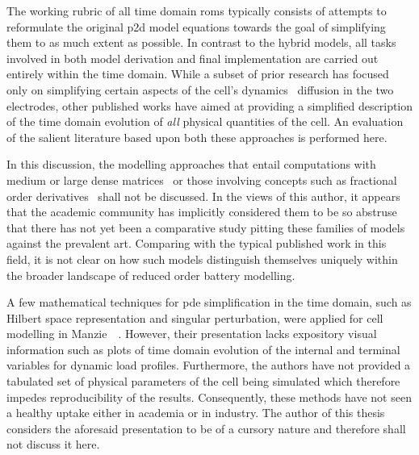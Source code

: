 The working rubric of all time domain \glspl{rom} typically consists of attempts
to  reformulate the  original  \gls{p2d}  model equations  towards  the goal  of
simplifying  them to  as much  extent  as possible.  In contrast  to the  hybrid
models, all tasks involved in both model derivation and final implementation are
carried out  entirely within the time  domain. While a subset  of prior research
has  focused  only  on  simplifying  certain  aspects  of  the  cell's  dynamics
\eg~diffusion  in  the two  electrodes,  other  published  works have  aimed  at
providing a  simplified description of  the time domain evolution  of \emph{all}
physical quantities of  the cell. An evaluation of the  salient literature based
upon both these approaches is performed here.


In  this discussion,  the  modelling approaches  that  entail computations  with
medium or large dense matrices~\cite{Li2016,Xu2016,Corno2015} or those involving
concepts such  as fractional  order derivatives~\cite{Sabatier2014,Sabatier2015,
Li2017, Mu2017, Wang2017}  shall not be discussed. In the  views of this author,
it appears that  the academic community has implicitly considered  them to be so
abstruse that there has not yet  been a comparative study pitting these families
of models against  the prevalent art. Comparing with the  typical published work
in  this field,  it  is not  clear  on how  such  models distinguish  themselves
uniquely within the broader landscape of reduced order battery modelling.

\addlines[0.5]
A few mathematical  techniques for \gls{pde} simplification in  the time domain,
such as Hilbert space representation and singular perturbation, were applied for
cell  modelling in  Manzie~\etal~\cite{Manzie2015}. However,  their presentation
lacks expository  visual information such as  plots of time domain  evolution of
the internal and terminal variables  for dynamic load profiles. Furthermore, the
authors  have  not provided  a  tabulated  set  of  physical parameters  of  the
cell being  simulated which  therefore impedes  reproducibility of  the results.
Consequently, these methods have not seen a healthy uptake either in academia or
in industry. The  author of this thesis  considers the aforesaid presentation to
be of a cursory nature  and therefore  shall  not discuss it here.


